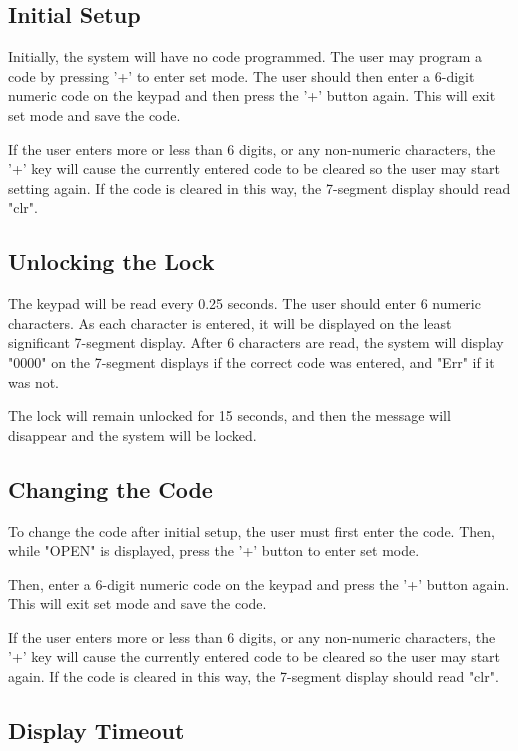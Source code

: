 \documentclass[11pt]{article}
\begin{document}
\subsection{Initial Setup}

Initially, the system will have no code programmed. The user may program a code by pressing '+' to enter set mode. The user should then enter a 6-digit numeric code on the keypad and then press the '+' button again. This will exit set mode and save the code.

If the user enters more or less than 6 digits, or any non-numeric characters, the '+' key will cause the currently entered code to be cleared so the user may start setting again. If the code is cleared in this way, the 7-segment display should read "clr".

\subsection{Unlocking the Lock}

The keypad will be read every 0.25 seconds. The user should enter 6 numeric characters. As each character is entered,  it will be displayed on the least significant 7-segment display. After 6 characters are read, the system will display "0000" on the 7-segment displays if the correct code was entered, and "Err" if it was not.

The lock will remain unlocked for 15 seconds, and then the message will disappear and the system will be locked.

\subsection{Changing the Code}

To change the code after initial setup, the user must first enter the code. Then, while "OPEN" is displayed, press the '+' button to enter set mode.

Then, enter a 6-digit numeric code on the keypad and press the '+' button again. This will exit set mode and save the code.

If the user enters more or less than 6 digits, or any non-numeric characters, the '+' key will cause the currently entered code to be cleared so the user may start again. If the code is cleared in this way, the 7-segment display should read "clr".

\subsection{Display Timeout}
\end{document}
